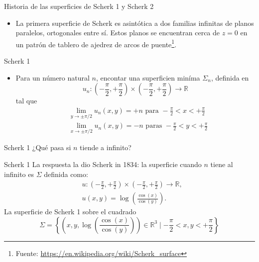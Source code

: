 \documentclass[10pt]{beamer}
\begin{document}
    \begin{frame}{Historia de las superficies de Scherk 1 y Scherk 2}
    \begin{itemize}
      \item La primera superficie de Scherk es asintótica a dos familias infinitas de planos paralelos, ortogonales entre sí. Estos planos se encuentran cerca de $z = 0$ en un patrón de tablero de ajedrez de arcos de puente\footnote{Fuente: \url{https://en.wikipedia.org/wiki/Scherk_surface}}.
    \end{itemize}
    \end{frame}

    \begin{frame}{Scherk 1}

      \begin{itemize}
        \item Para un número natural $n$, encontar una superficien miníma $\Sigma_n$, definida en
        $$
        u_n:\left(-\frac{\pi}{2},+\frac{\pi}{2}\right) \times\left(-\frac{\pi}{2},+\frac{\pi}{2}\right) \rightarrow \mathbb{R}
        $$
        tal que 
        $$
        \begin{aligned}
        & \lim _{y \rightarrow \pm \pi / 2} u_n(x, y)=+n \text { para }-\frac{\pi}{2}<x<+\frac{\pi}{2} \\
        & \lim _{x \rightarrow \pm \pi / 2} u_n(x, y)=-n \text { paras }-\frac{\pi}{2}<y<+\frac{\pi}{2}
        \end{aligned}
        $$
       
    
      \end{itemize}
      
    \end{frame}

    \begin{frame}{Scherk 1}
      ¿Qué pasa si $n$ tiende a infinito? 
    
    \end{frame}
    \begin{frame}{Scherk 1}
      La respuesta la dio Scherk in 1834: la superficie cuando $n$ tiene al infinito es $\Sigma$ definida como: 
        $$
        \begin{aligned}
        & u:\left(-\frac{\pi}{2},+\frac{\pi}{2}\right) \times\left(-\frac{\pi}{2},+\frac{\pi}{2}\right) \rightarrow \mathbb{R}, \\
        & u(x, y)=\log \left(\frac{\cos (x)}{\cos (y)}\right) .
        \end{aligned}
        $$
        La superficie de Scherk 1 sobre el cuadrado
        $$
        \Sigma=\left\{\left(x, y, \log \left(\frac{\cos (x)}{\cos (y)}\right)\right) \in \mathbb{R}^3 \mid-\frac{\pi}{2}<x, y<+\frac{\pi}{2}\right\}
        $$
    \end{frame}
\end{document}
